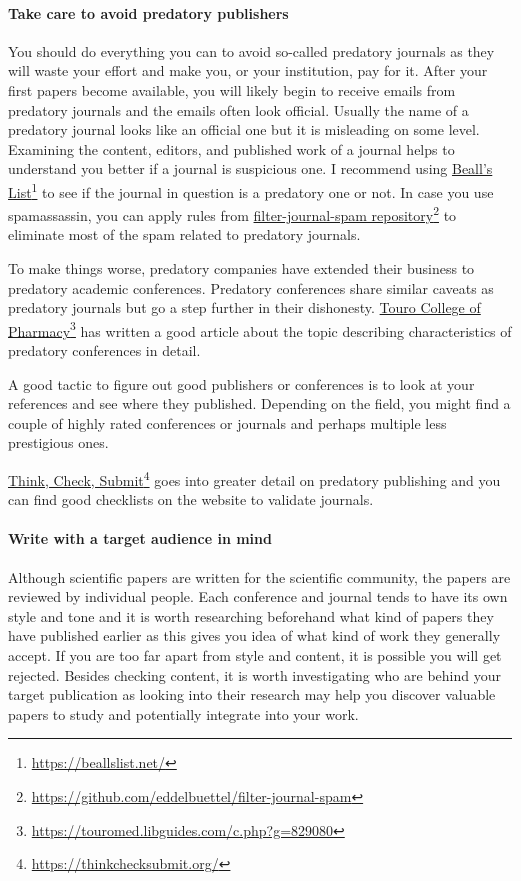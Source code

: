 \paragraph{Take care to avoid predatory publishers}

You should do everything you can to avoid so-called predatory journals as they will waste your effort and make you, or your institution, pay for it.
After your first papers become available, you will likely begin to receive emails from predatory journals and the emails often look official.
Usually the name of a predatory journal looks like an official one but it is misleading on some level.
Examining the content, editors, and published work of a journal helps to understand you better if a journal is suspicious one.
I recommend using \href{https://beallslist.net/}{Beall's List}\footnote{\url{https://beallslist.net/}} to see if the journal in question is a predatory one or not.
In case you use spamassassin, you can apply rules from \href{https://github.com/eddelbuettel/filter-journal-spam}{filter-journal-spam repository}\footnote{\url{https://github.com/eddelbuettel/filter-journal-spam}} to eliminate most of the spam related to predatory journals.

To make things worse, predatory companies have extended their business to predatory academic conferences.
Predatory conferences share similar caveats as predatory journals but go a step further in their dishonesty.
\href{https://touromed.libguides.com/c.php?g=829080}{Touro College of Pharmacy}\footnote{\url{https://touromed.libguides.com/c.php?g=829080}} has written a good article about the topic describing characteristics of predatory conferences in detail.

A good tactic to figure out good publishers or conferences is to look at your references and see where they published.
Depending on the field, you might find a couple of highly rated conferences or journals and perhaps multiple less prestigious ones.

\href{https://thinkchecksubmit.org/}{Think, Check, Submit}\footnote{\url{https://thinkchecksubmit.org/}} goes into greater detail on predatory publishing and you can find good checklists on the website to validate journals.

\paragraph{Write with a target audience in mind}

Although scientific papers are written for the scientific community, the papers are reviewed by individual people.
Each conference and journal tends to have its own style and tone and it is worth researching beforehand what kind of papers they have published earlier as this gives you idea of what kind of work they generally accept.
If you are too far apart from style and content, it is possible you will get rejected.
Besides checking content, it is worth investigating who are behind your target publication as looking into their research may help you discover valuable papers to study and potentially integrate into your work.

